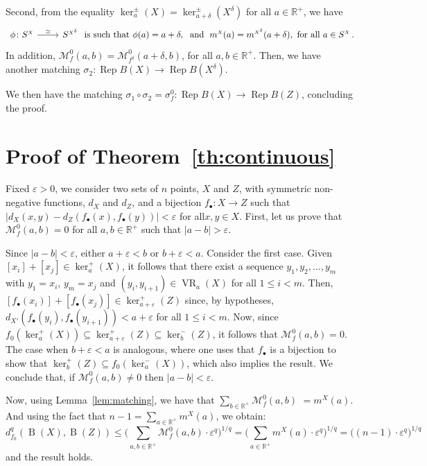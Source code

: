 \documentclass{article}
\DeclareMathOperator{\VR}{VR}
\DeclareMathOperator{\B}{B}
\DeclareMathOperator{\Rep}{Rep}
\newcommand{\R}{\mathbb{R}^+}
\newcommand{\cM}{\mathcal{M}}
\newcommand{\scst}{\scriptscriptstyle}
\newcommand{\cMXZ}{\cM_f^0}
\newcommand{\veps}{\varepsilon}
\newcommand{\dM}{d_{f_0}}
\newcommand{\dX}{d_{\scst X}}
\newcommand{\dZ}{d_{\scst Z}}
\newcommand{\SX}{S^{\scst X}}
\newcommand{\mX}{m^{\scst X}}
\newcommand{\Xdelta}{X^{\delta}}
\newcommand{\dXp}{d_{\scst X'}}
\begin{document}
Second,  
from the equality $\ker^\pm_a(X)=\ker^\pm_{a+\delta}(X^\delta)$ for all $a \in \R$, we have
\[\begin{tikzcd}
    \phi \colon \SX \ar[r, "\simeq"] & 
     S^{\scst \Xdelta}
     \end{tikzcd}\mbox{ is such that }
     \phi(a)=a+\delta,\;\mbox{  and }\;
     \mX(a)=m^{\scst \Xdelta}(a+\delta),
     \mbox{ for all }a\in\SX\,.
     \] 
  In addition,  
  $\cMXZ(a,b) = \cM^0_{f^{\delta}}(a+\delta, b)$, for all $a,b \in \R$.
Then, we have another matching $\sigma_2\colon\Rep B(X)\to \Rep B(\Xdelta)$. 

We then have the matching 
$ \sigma_1\circ \sigma_2=\sigma_f^0\colon \Rep B(X)\to \Rep B(Z)$, concluding the proof.


\section{Proof of Theorem~\ref{th:continuous}}\label{proofth:continuous}



Fixed $\veps>0$, 
we consider two sets of $n$ points, 
$X$ and $Z$, with symmetric non-negative functions, $\dX$ and $\dZ$, and a bijection $f_\bullet\colon X\rightarrow Z$ such that $|\dX(x,y)-\dZ(f_\bullet(x), f_\bullet(y))| < \veps$ for all$x,y\in X$.
 First, let us prove that 
$\cM^0_{f}(a,b)=0$ for all $a,b \in \R$ such that $|a-b|>\veps$.

Since $|a-b|<\veps$, either $a+\veps < b$ or $b+\veps < a$. Consider the first case. 
    Given $[x_i]+[x_j]\in \ker^+_a(X)$, it follows that there exist a sequence 
          $y_1, y_2, \ldots, y_m$ with $y_1=x_i$, $y_m=x_j$ and $(y_i,y_{i+1})
    \in \VR_a(X)$
    for all $1 \leq i < m$. 
    Then,     
    $[f_\bullet(x_i)] + [f_\bullet(x_j)] \in \ker^+_{a+\veps}(Z)$ since, by hypotheses, $\dXp(f_\bullet(y_i), f_\bullet(y_{i+1}))< a+\veps$ for all $1 \leq i < m$.
    Now, since 
    $f_0(\ker^+_a(X)) \subseteq \ker^+_{a+\veps}(Z)\subseteq \ker^-_{b}(Z)$, it follows that $\cMXZ(a,b)=0$. 
    The case when $b+\veps < a$ is analogous, where one uses that $f_\bullet$ is a bijection to show that $\ker^+_{b}(Z) \subseteq f_0(\ker^-_{a}(X))$, which also implies the result.
We conclude that, if $\cMXZ(a,b)\neq 0$ then $|a-b|<\veps$.    

 Now, using Lemma~\ref{lem:matching}, we have that
        $\sum_{b \in \R} \cMXZ(a,b)$ $ = \mX(a)$.
     And using the fact that $
           n-1 = \sum_{a \in \R}\mX(a)$, we obtain: 
    \[
        \dM^q(\B(X),\B(Z)) 
        \leq 
        \Bigg(\sum_{a,b \in \R}\cMXZ (a,b)\cdot    
        \veps^q\Bigg)^{1/q}
        = 
        \Bigg(\sum_{a \in \R}
        \mX(a)\cdot     
        \veps^q\Bigg)^{1/q}
        = \Big( (n-1) \cdot \veps^q \Big)^{1/q}
    \]
    and the result holds.
\end{document}
